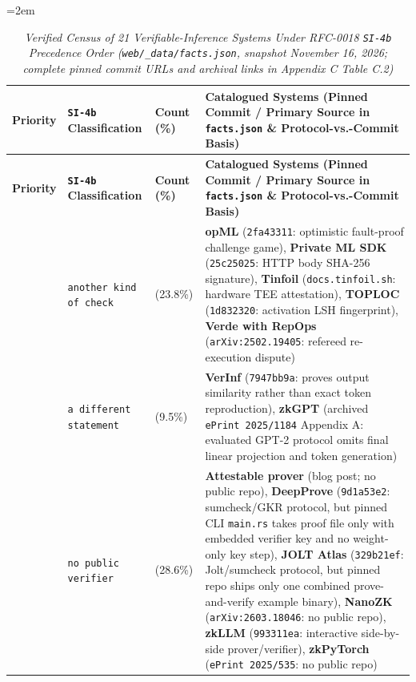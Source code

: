 \documentclass[11pt,letterpaper]{article}
\begin{document}
{\footnotesize\setlength{\tabcolsep}{4pt}\emergencystretch=2em
\begin{longtable}{@{}>{\raggedright\arraybackslash}p{} >{\raggedright\arraybackslash}p{} >{\raggedright\arraybackslash}p{} >{\raggedright\arraybackslash}p{}@{}}
\caption{\textit{Verified Census of 21 Verifiable-Inference Systems Under RFC-0018 \texttt{SI-4b} Precedence Order (\texttt{web/\allowbreak{}\_\allowbreak{}data/\allowbreak{}facts.\allowbreak{}json}, snapshot November 16, 2026; complete pinned commit URLs and archival links in Appendix C Table C.2)} \cite{iproofs2026}} \\
\toprule
\textbf{Priority} & \textbf{\texttt{SI-4b} Classification} & \textbf{Count (\%)} & \textbf{Catalogued Systems (Pinned Commit / Primary Source in \texttt{facts.\allowbreak{}json} \cite{iproofs2026} \& Protocol-vs.-Commit Basis)} \\
\midrule
\endfirsthead
\toprule
\textbf{Priority} & \textbf{\texttt{SI-4b} Classification} & \textbf{Count (\%)} & \textbf{Catalogued Systems (Pinned Commit / Primary Source in \texttt{facts.\allowbreak{}json} \cite{iproofs2026} \& Protocol-vs.-Commit Basis)} \\
\midrule
\endhead
\bottomrule
\endfoot
1 & \texttt{another kind of check} & 5 (23.8\%) & \textbf{opML} (\texttt{2fa43311}: optimistic fault-proof challenge game), \textbf{Private ML SDK} (\texttt{25c25025}: HTTP body SHA-256 signature), \textbf{Tinfoil} (\texttt{docs.\allowbreak{}tinfoil.\allowbreak{}sh}: hardware TEE attestation), \textbf{TOPLOC} (\texttt{1d832320}: activation LSH fingerprint), \textbf{Verde with RepOps} (\texttt{arXiv:\allowbreak{}2502.19405}: refereed re-execution dispute) \\
2 & \texttt{a different statement} & 2 (9.5\%) & \textbf{VerInf} (\texttt{7947bb9a}: proves output similarity rather than exact token reproduction), \textbf{zkGPT} (archived \texttt{ePrint 2025/\allowbreak{}1184} Appendix A: evaluated GPT-2 protocol omits final linear projection and token generation) \\
3 & \texttt{no public verifier} & 6 (28.6\%) & \textbf{Attestable prover} (blog post; no public repo), \textbf{DeepProve} (\texttt{9d1a53e2}: sumcheck/GKR protocol, but pinned CLI \texttt{main.\allowbreak{}rs} takes proof file only with embedded verifier key and no weight-only key step), \textbf{JOLT Atlas} (\texttt{329b21ef}: Jolt/sumcheck protocol, but pinned repo ships only one combined prove-and-verify example binary), \textbf{NanoZK} (\texttt{arXiv:\allowbreak{}2603.18046}: no public repo), \textbf{zkLLM} (\texttt{993311ea}: interactive side-by-side prover/verifier), \textbf{zkPyTorch} (\texttt{ePrint 2025/\allowbreak{}535}: no public repo) \\

\end{longtable}}
\end{document}
